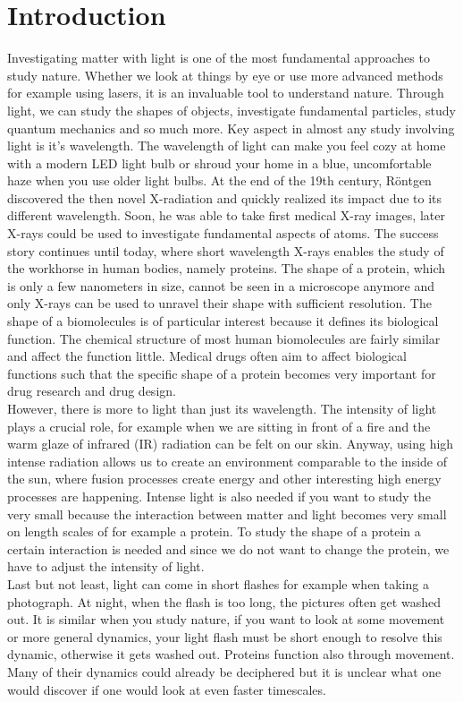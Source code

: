 \chapter{Introduction}
Investigating matter with light is one of the most fundamental approaches to study nature. Whether we look at things by eye or use more advanced methods for example using lasers, it is an invaluable tool to understand nature. Through light, we can study the shapes of objects, investigate fundamental particles, study quantum mechanics and so much more. Key aspect in almost any study involving light is it's wavelength. The wavelength of light can make you feel cozy at home with a modern LED light bulb or shroud your home in a blue, uncomfortable haze when you use older light bulbs. At the end of the 19th century, R\"ontgen discovered the then novel X-radiation and quickly realized its impact due to its different wavelength. Soon, he was able to take first medical X-ray images, later X-rays could be used to investigate fundamental aspects of atoms. The success story continues until today, where short wavelength X-rays enables the study of the workhorse in human bodies, namely proteins. The shape of a protein, which is only a few nanometers in size, cannot be seen in a microscope anymore and only X-rays can be used to unravel their shape with sufficient resolution. The shape of a biomolecules is of particular interest because it defines its biological function. The chemical structure of most human biomolecules are fairly similar and affect the function little. Medical drugs often aim to affect biological functions such that the specific shape of a protein becomes very important for drug research and drug design.\\
However, there is more to light than just its wavelength. The intensity of light plays a crucial role, for example when we are sitting in front of a fire and the warm glaze of infrared (IR) radiation can be felt on our skin. Anyway, using high intense radiation allows us to create an environment comparable to the inside of the sun, where fusion processes create energy and other interesting high energy processes are happening. Intense light is also needed if you want to study the very small because the interaction between matter and light becomes very small on length scales of for example a protein. To study the shape of a protein a certain interaction is needed and since we do not want to change the protein, we have to adjust the intensity of light.\\
Last but not least, light can come in short flashes for example when taking a photograph. At night, when the flash is too long, the pictures often get washed out. It is similar when you study nature, if you want to look at some movement or more general dynamics, your light flash must be short enough to resolve this dynamic, otherwise it gets washed out. Proteins function also through movement. Many of their dynamics could already be deciphered but it is unclear what one would discover if one would look at even faster timescales.\\
